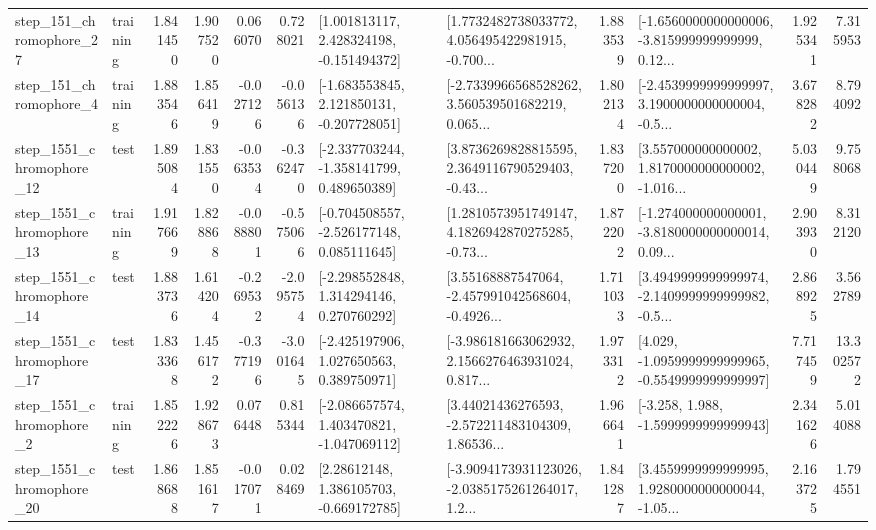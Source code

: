 \begin{tabular}{llrrrrllrlrr}
  step\_151\_chromophore\_27 &  training &      1.841450 &    1.907520 &      0.066070 &  0.728021 &    [1.001813117, 2.428324198, -0.151494372] &  [1.7732482738033772, 4.056495422981915, -0.700... &       1.883539 &  [-1.6560000000000006, -3.815999999999999, 0.12... &            1.925341 &          7.315953 \\
   step\_151\_chromophore\_4 &  training &      1.883546 &    1.856419 &     -0.027126 & -0.056136 &   [-1.683553845, 2.121850131, -0.207728051] &  [-2.7339966568528262, 3.560539501682219, 0.065... &       1.802134 &  [-2.4539999999999997, 3.1900000000000004, -0.5... &            3.678282 &          8.794092 \\
 step\_1551\_chromophore\_12 &      test &      1.895084 &    1.831550 &     -0.063534 & -0.362470 &   [-2.337703244, -1.358141799, 0.489650389] &  [3.8736269828815595, 2.3649116790529403, -0.43... &       1.837200 &  [3.557000000000002, 1.8170000000000002, -1.016... &            5.030449 &          9.758068 \\
 step\_1551\_chromophore\_13 &  training &      1.917669 &    1.828868 &     -0.088801 & -0.575066 &   [-0.704508557, -2.526177148, 0.085111645] &  [1.2810573951749147, 4.1826942870275285, -0.73... &       1.872202 &  [-1.274000000000001, -3.8180000000000014, 0.09... &            2.903930 &          8.312120 \\
 step\_1551\_chromophore\_14 &      test &      1.883736 &    1.614204 &     -0.269532 & -2.095754 &    [-2.298552848, 1.314294146, 0.270760292] &  [3.55168887547064, -2.457991042568604, -0.4926... &       1.711033 &  [3.4949999999999974, -2.1409999999999982, -0.5... &            2.868925 &          3.562789 \\
 step\_1551\_chromophore\_17 &      test &      1.833368 &    1.456172 &     -0.377196 & -3.001645 &    [-2.425197906, 1.027650563, 0.389750971] &  [-3.986181663062932, 2.1566276463931024, 0.817... &       1.973312 &  [4.029, -1.0959999999999965, -0.5549999999999997] &            7.717459 &         13.302572 \\
  step\_1551\_chromophore\_2 &  training &      1.852226 &    1.928673 &      0.076448 &  0.815344 &   [-2.086657574, 1.403470821, -1.047069112] &  [3.44021436276593, -2.572211483104309, 1.86536... &       1.966641 &               [-3.258, 1.988, -1.5999999999999943] &            2.341626 &          5.014088 \\
 step\_1551\_chromophore\_20 &      test &      1.868688 &    1.851617 &     -0.017071 &  0.028469 &     [2.28612148, 1.386105703, -0.669172785] &  [-3.9094173931123026, -2.0385175261264017, 1.2... &       1.841287 &  [3.4559999999999995, 1.9280000000000044, -1.05... &            2.163725 &          1.794551 \\

\end{tabular}
